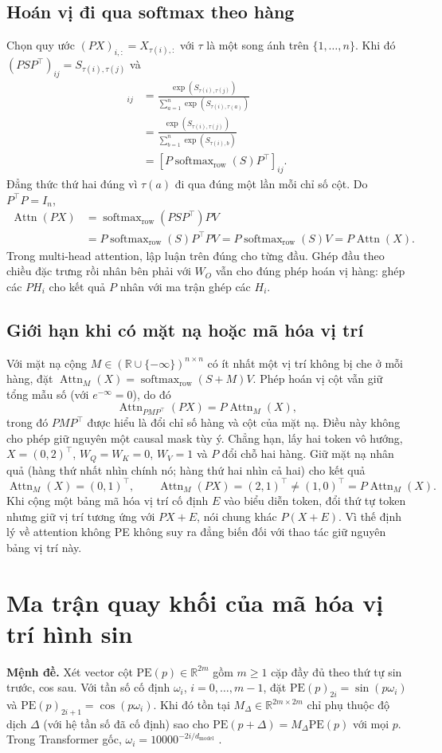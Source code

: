 \documentclass[11pt,a4paper]{article}
\DeclareMathOperator{\softmax}{softmax}
\newcommand{\R}{\mathbb{R}}
\newcommand{\PE}{\mathrm{PE}}
\newcommand{\Attn}{\operatorname{Attn}}
\begin{document}
\subsection*{Hoán vị đi qua softmax theo hàng}
Chọn quy ước $(PX)_{i,:}=X_{\tau(i),:}$ với $\tau$ là một song ánh trên $\{1,\ldots,n\}$. Khi đó $(PSP^\top)_{ij}=S_{\tau(i),\tau(j)}$ và
\begin{align*}
  [\softmax_{\mathrm{row}}(PSP^\top)]_{ij}
    &=\frac{\exp(S_{\tau(i),\tau(j)})}{\sum_{a=1}^{n}\exp(S_{\tau(i),\tau(a)})}\\
    &=\frac{\exp(S_{\tau(i),\tau(j)})}{\sum_{b=1}^{n}\exp(S_{\tau(i),b})}\\
    &=[P\softmax_{\mathrm{row}}(S)P^\top]_{ij}.
\end{align*}
Đẳng thức thứ hai đúng vì $\tau(a)$ đi qua đúng một lần mỗi chỉ số cột. Do $P^\top P=I_n$,
\begin{align*}
  \Attn(PX)
    &=\softmax_{\mathrm{row}}(PSP^\top)PV\\
    &=P\softmax_{\mathrm{row}}(S)P^\top PV
      =P\softmax_{\mathrm{row}}(S)V=P\Attn(X).
\end{align*}
Trong multi-head attention, lập luận trên đúng cho từng đầu. Ghép đầu theo chiều đặc trưng rồi nhân bên phải với $W_O$ vẫn cho đúng phép hoán vị hàng: ghép các $PH_i$ cho kết quả $P$ nhân với ma trận ghép các $H_i$.

\subsection*{Giới hạn khi có mặt nạ hoặc mã hóa vị trí}
Với mặt nạ cộng $M\in(\R\cup\{-\infty\})^{n\times n}$ có ít nhất một vị trí không bị che ở mỗi hàng, đặt $\Attn_M(X)=\softmax_{\mathrm{row}}(S+M)V$. Phép hoán vị cột vẫn giữ tổng mẫu số (với $e^{-\infty}=0$), do đó
\[
  \Attn_{PMP^\top}(PX)=P\Attn_M(X),
\]
trong đó $PMP^\top$ được hiểu là đổi chỉ số hàng và cột của mặt nạ. Điều này không cho phép giữ nguyên một causal mask tùy ý. Chẳng hạn, lấy hai token vô hướng, $X=(0,2)^\top$, $W_Q=W_K=0$, $W_V=1$ và $P$ đổi chỗ hai hàng. Giữ mặt nạ nhân quả (hàng thứ nhất nhìn chính nó; hàng thứ hai nhìn cả hai) cho kết quả
\[
  \Attn_M(X)=(0,1)^\top,\qquad
  \Attn_M(PX)=(2,1)^\top\ne(1,0)^\top=P\Attn_M(X).
\]
Khi cộng một bảng mã hóa vị trí cố định $E$ vào biểu diễn token, đổi thứ tự token nhưng giữ vị trí tương ứng với $PX+E$, nói chung khác $P(X+E)$. Vì thế định lý về attention không PE không suy ra đẳng biến đối với thao tác giữ nguyên bảng vị trí này.

\section{Ma trận quay khối của mã hóa vị trí hình sin}
\label{sec:pe}
\textbf{Mệnh đề.} Xét vector cột $\PE(p)\in\R^{2m}$ gồm $m\ge1$ cặp đầy đủ theo thứ tự sin trước, cos sau. Với tần số cố định $\omega_i$, $i=0,\ldots,m-1$, đặt $\PE(p)_{2i}=\sin(p\omega_i)$ và $\PE(p)_{2i+1}=\cos(p\omega_i)$. Khi đó tồn tại $M_\Delta\in\R^{2m\times 2m}$ chỉ phụ thuộc độ dịch $\Delta$ (với hệ tần số đã cố định) sao cho $\PE(p+\Delta)=M_\Delta\PE(p)$ với mọi $p$. Trong Transformer gốc, $\omega_i=10000^{-2i/d_{\mathrm{model}}}$ \cite[§3.5]{attention}.
\end{document}
